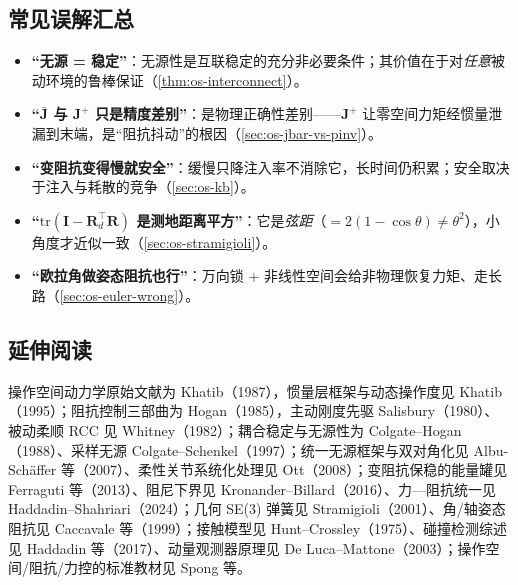 \subsection*{常见误解汇总}
\begin{itemize}
  \item \textbf{“无源 = 稳定”}：无源性是互联稳定的充分非必要条件；其价值在于对\emph{任意}被动环境的鲁棒保证（\cref{thm:os-interconnect}）。
  \item \textbf{“$\bar{\mathbf J}$ 与 $\mathbf J^+$ 只是精度差别”}：是物理正确性差别——$\mathbf J^+$ 让零空间力矩经惯量泄漏到末端，是“阻抗抖动”的根因（\cref{sec:os-jbar-vs-pinv}）。
  \item \textbf{“变阻抗变得慢就安全”}：缓慢只降注入率不消除它，长时间仍积累；安全取决于注入与耗散的竞争（\cref{sec:os-kb}）。
  \item \textbf{“$\mathrm{tr}(\mathbf I-\mathbf R_d^\top\mathbf R)$ 是测地距离平方”}：它是\emph{弦距}（$=2(1-\cos\theta)\neq\theta^2$），小角度才近似一致（\cref{sec:os-stramigioli}）。
  \item \textbf{“欧拉角做姿态阻抗也行”}：万向锁 + 非线性空间会给非物理恢复力矩、走长路（\cref{sec:os-euler-wrong}）。
\end{itemize}

\subsection*{延伸阅读}
操作空间动力学原始文献为 Khatib（1987）\cite{khatib1987operational}，惯量层框架与动态操作度见 Khatib（1995）\cite{khatib1995inertial}；阻抗控制三部曲为 Hogan（1985）\cite{hogan1985impedance}，主动刚度先驱 Salisbury（1980）\cite{salisbury1980active}、被动柔顺 RCC 见 Whitney（1982）\cite{whitney1982quasistatic}；耦合稳定与无源性为 Colgate--Hogan（1988）\cite{colgate1988robust}、采样无源 Colgate--Schenkel（1997）\cite{colgate1997passivity}；统一无源框架与双对角化见 Albu-Sch\"affer 等（2007）\cite{albuschaffer2007unified}、柔性关节系统化处理见 Ott（2008）\cite{ott2008cartesian}；变阻抗保稳的能量罐见 Ferraguti 等（2013）\cite{ferraguti2013tank}、阻尼下界见 Kronander--Billard（2016）\cite{kronander2016stability}、力—阻抗统一见 Haddadin--Shahriari（2024）\cite{shahriari2024unified}；几何 SE(3) 弹簧见 Stramigioli（2001）\cite{stramigioli2001modeling}、角/轴姿态阻抗见 Caccavale 等（1999）\cite{caccavale1999sixdof}；接触模型见 Hunt--Crossley（1975）\cite{hunt1975coefficient}、碰撞检测综述见 Haddadin 等（2017）\cite{haddadin2017collision}、动量观测器原理见 De Luca--Mattone（2003）\cite{deluca2003actuator}；操作空间/阻抗/力控的标准教材见 Spong 等\cite{spong2006robot}。
